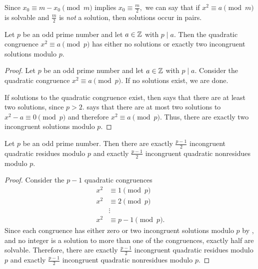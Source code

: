 \documentclass[letterpaper, 11 pt]{ximera}
\theoremstyle{definition}
\begin{document}
\begin{remark}
    Since $x_0\equiv m-x_0\pmod{m}$ implies $x_0\equiv \frac{m}{2},$ we can say that if $x^2\equiv a\pmod{m}$ is solvable and $\frac{m}{2}$ is \emph{not} a solution, then solutions occur in pairs.
\end{remark}

\begin{prop*}[Proposition 4.1]\label{prop:number-sqrts}
    Let $p$ be an odd prime number and let $a\in\mathbb Z$ with $p\mid a.$ Then the quadratic congruence $x^2\equiv a\pmod{p}$ has either no solutions or exactly two incongruent solutions modulo $p$.
\end{prop*}

\begin{proof}
	Let $p$ be an odd prime number and let $a\in\mathbb Z$ with $p\mid a.$ Consider the quadratic congruence $x^2\equiv a\pmod{p}.$ If no solutions exist, we are done.
	
	If solutions to the quadratic congruence exist, then  says that there are at least two solutions, since $p>2.$  says that there are at most two solutions to $x^2-a\equiv 0\pmod{p}$ and therefore $x^2\equiv a\pmod{p}.$ Thus, there are exactly two incongruent solutions modulo $p.$
\end{proof}

\begin{prop*}[Proposition 4.3]\label{prop:number-quad-residues}
	Let $p$ be an odd prime number. Then there are exactly $\frac{p-1}{2}$ incongruent quadratic residues modulo $p$ and exactly $\frac{p-1}{2}$ incongruent quadratic nonresidues modulo $p.$
\end{prop*}
\begin{proof}
	Consider the $p-1$ quadratic congruences
	\begin{align*}
 		x^2&\equiv 1\pmod{p}\\
		x^2&\equiv 2\pmod{p}\\
		&\vdots\\
		x^2&\equiv p-1\pmod{p}.
	\end{align*}
	Since each congruence has either zero or two incongruent solutions modulo $p$ by , and no integer is a solution to more than one of the congruences, exactly half are solvable. Therefore,  there are exactly $\frac{p-1}{2}$ incongruent quadratic residues modulo $p$ and exactly $\frac{p-1}{2}$ incongruent quadratic nonresidues modulo $p.$
\end{proof}
\end{document}

